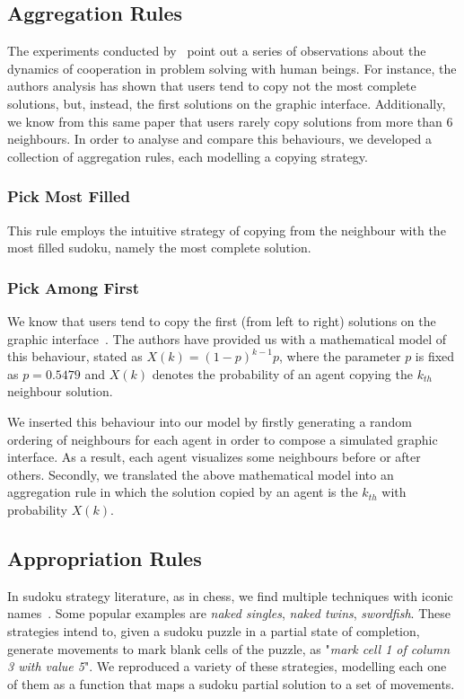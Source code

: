\documentclass{article}
\begin{document}
\subsection{Aggregation Rules}

The experiments conducted by~\cite{farenzena:collabem} point out a series of observations about the dynamics of cooperation in problem solving with human beings. For instance, the authors analysis has shown that users tend to copy not the most complete solutions, but, instead, the first solutions on the graphic interface. Additionally, we know from this same paper that users rarely copy solutions from more than 6 neighbours. In order to analyse and compare this behaviours, we developed a collection of aggregation rules, each modelling a copying strategy.

\subsubsection{Pick Most Filled}

This rule employs the intuitive strategy of copying from the neighbour with the most filled sudoku, namely the most complete solution.

\subsubsection{Pick Among First}

We know that users tend to copy the first (from left to right) solutions on the graphic interface~\cite{farenzena:collabem}. The authors have provided us with a mathematical model of this behaviour, stated as $X(k) = (1-p)^{k-1}p$, where the parameter $p$ is fixed as $p = 0.5479$ and $X(k)$ denotes the probability of an agent copying the $k_{th}$ neighbour solution.

We inserted this behaviour into our model by firstly generating a random ordering of neighbours for each agent in order to compose a simulated graphic interface. As a result, each agent visualizes some neighbours before or after others. Secondly, we translated the above mathematical model into an aggregation rule in which the solution copied by an agent is the $k_{th}$ with probability $X(k)$.

\subsection{Appropriation Rules}

In sudoku strategy literature, as in chess, we find multiple techniques with iconic names~\cite{davis:mathsudoku}. Some popular examples are {\em naked singles}, {\em naked twins}, {\em swordfish}. These strategies intend to, given a sudoku puzzle in a partial state of completion, generate movements to mark blank cells of the puzzle, as "{\em mark cell 1 of column 3 with value 5}". We reproduced a variety of these strategies, modelling each one of them as a function that maps a sudoku partial solution to a set of movements.
\end{document}
